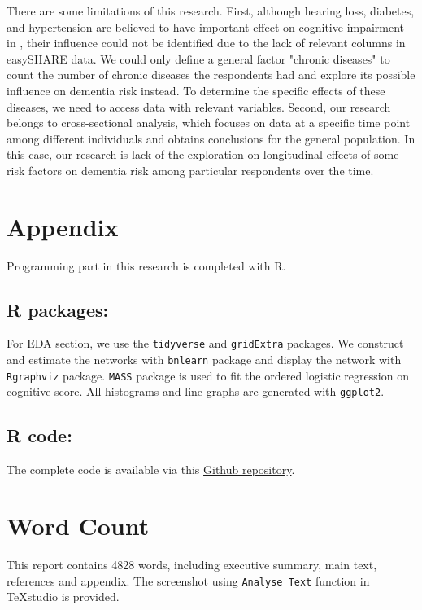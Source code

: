 \documentclass[11pt,twoside]{article}
\numberwithin{Theorem}{section}
\numberwithin{Definition}{section}
\numberwithin{Lemma}{section}
\numberwithin{Algorithm}{section}
\numberwithin{equation}{section}
\begin{document}
There are some limitations of this research. First, although hearing loss, diabetes, and hypertension are believed to have important effect on cognitive impairment in \cite{livingston2017dementia}, their influence could not be identified due to the lack of relevant columns in easySHARE data. We could only define a general factor "chronic diseases" to count the number of chronic diseases the respondents had and explore its possible influence on dementia risk instead. To determine the specific effects of these diseases, we need to access data with relevant variables. Second, our research belongs to cross-sectional analysis, which focuses on data at a specific time point among different individuals and obtains conclusions for the general population. In this case, our research is lack of the exploration on longitudinal effects of some risk factors on dementia risk among particular respondents over the time.

\clearpage



\clearpage

\appendix
\section*{Appendix}

Programming part in this research is completed with R. 

\subsection*{R packages:}

For EDA section, we use the \texttt{tidyverse} and \texttt{gridExtra} packages. We construct and estimate the networks with \texttt{bnlearn} package and display the network with \texttt{Rgraphviz} package. \texttt{MASS} package is used to fit the ordered logistic regression on cognitive score. All histograms and line graphs are generated with \texttt{ggplot2}.

\subsection*{R code: }
The complete code is available via this \href{https://github.com/Shi-Yile/Project-1-Dementia-Risk-Factors.git}{Github repository}.

\clearpage

\section*{Word Count}

This report contains 4828 words, including executive summary, main text, references and appendix. The screenshot using  \texttt{Analyse Text} function in TeXstudio is provided.
\end{document}

